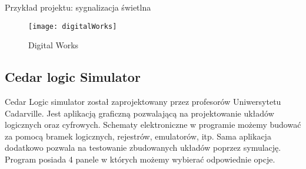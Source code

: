 \documentclass[12pt, a4paper, onside, polish]{article}				%
\begin{document}
\cleardoublepage
Przykład projektu: sygnalizacja świetlna
\begin{figure}[hbt!]
{\centering \texttt{[image: digitalWorks]} \caption{Digital Works}}\vspace{5mm}
\end{figure}

\subsection{Cedar logic Simulator}
\hspace{\parindent}
Cedar Logic simulator został zaprojektowany przez profesorów Uniwersytetu Cadarville. Jest aplikacją graficzną pozwalającą na projektowanie układów logicznych oraz cyfrowych. Schematy elektroniczne w programie możemy budować za pomocą bramek logicznych, rejestrów, emulatorów, itp. Sama aplikacja dodatkowo pozwala na testowanie zbudowanych układów poprzez symulację. \newline\newline
Program posiada 4 panele w których możemy wybierać odpowiednie opcje.
\end{document}

